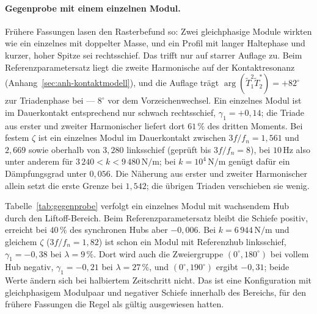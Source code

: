 \documentclass[12pt,a4paper]{report}
\begin{document}
\paragraph{Gegenprobe mit einem einzelnen Modul.}
Frühere Fassungen lasen den Rasterbefund so: Zwei gleichphasige Module
wirkten wie ein einzelnes mit doppelter Masse, und ein Profil mit langer
Haltephase und kurzer, hoher Spitze sei rechtsschief. Das trifft nur auf
starrer Auflage zu. Beim Referenzparametersatz liegt die zweite
Harmonische auf der Kontaktresonanz
(Anhang~\ref{sec:anh-kontaktmodell}), und die Auflage trägt
$\arg(\tilde{T}_1^{2}\tilde{T}_2^{*}) = +82^\circ$ zur Triadenphase bei
--- $8^\circ$ vor dem Vorzeichenwechsel. Ein einzelnes Modul ist im
Dauerkontakt entsprechend nur schwach rechtsschief, $\gamma_1 = +0{,}14$;
die Triade aus erster und zweiter Harmonischer liefert dort $61\,\%$ des
dritten Moments. Bei festem $\zeta$ ist ein einzelnes Modul im
Dauerkontakt zwischen $3f/f_n = 1{,}561$ und $2{,}669$ sowie oberhalb von
$3{,}280$ linksschief (geprüft bis $3f/f_n = 8$), bei $10\,\mathrm{Hz}$
also unter anderem für $3\,240 < k < 9\,480\,\mathrm{N/m}$; bei
$k = 10^{4}\,\mathrm{N/m}$ genügt dafür ein Dämpfungsgrad unter
$0{,}056$. Die Näherung aus erster und zweiter Harmonischer allein setzt
die erste Grenze bei $1{,}542$; die übrigen Triaden verschieben sie wenig.

Tabelle~\ref{tab:gegenprobe} verfolgt ein einzelnes Modul mit wachsendem
Hub durch den Liftoff-Bereich. Beim Referenzparametersatz bleibt die
Schiefe positiv, erreicht bei $40\,\%$ des synchronen Hubs aber
$-0{,}006$. Bei $k = 6\,944\,\mathrm{N/m}$ und gleichem $\zeta$
($3f/f_n = 1{,}82$) ist schon ein Modul mit Referenzhub linksschief,
$\gamma_1 = -0{,}38$ bei $\lambda = 9\,\%$. Dort wird auch die
Zweiergruppe $(0^\circ, 180^\circ)$ bei vollem Hub negativ,
$\gamma_1 = -0{,}21$ bei $\lambda = 27\,\%$, und $(0^\circ, 190^\circ)$
ergibt $-0{,}31$; beide Werte ändern sich bei halbiertem Zeitschritt
nicht. Das ist eine Konfiguration mit gleichphasigem Modulpaar und
negativer Schiefe innerhalb des Bereichs, für den frühere Fassungen die
Regel als gültig ausgewiesen hatten.
\end{document}
